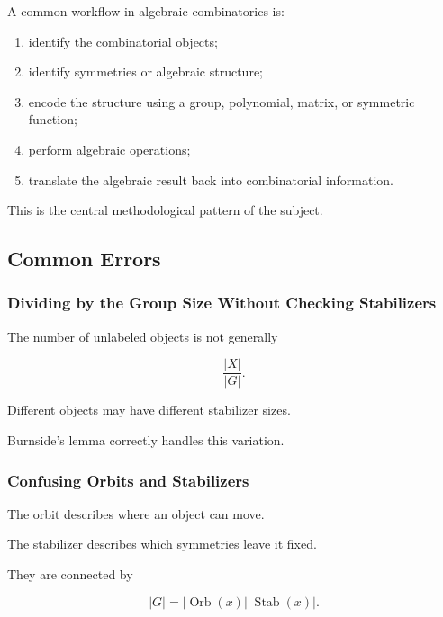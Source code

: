A common workflow in algebraic combinatorics is:

\begin{enumerate}
    \item identify the combinatorial objects;
    \item identify symmetries or algebraic structure;
    \item encode the structure using a group, polynomial, matrix, or
          symmetric function;
    \item perform algebraic operations;
    \item translate the algebraic result back into combinatorial
          information.
\end{enumerate}

This is the central methodological pattern of the subject.

\subsection{Common Errors}
\label{subsec:algebraic-combinatorics-common-errors}

\subsubsection{Dividing by the Group Size Without Checking Stabilizers}

The number of unlabeled objects is not generally

\[
\frac{|X|}{|G|}.
\]

Different objects may have different stabilizer sizes.

Burnside's lemma correctly handles this variation.

\subsubsection{Confusing Orbits and Stabilizers}

The orbit describes where an object can move.

The stabilizer describes which symmetries leave it fixed.

They are connected by

\[
|G|
=
|\operatorname{Orb}(x)|
|\operatorname{Stab}(x)|.
\]

